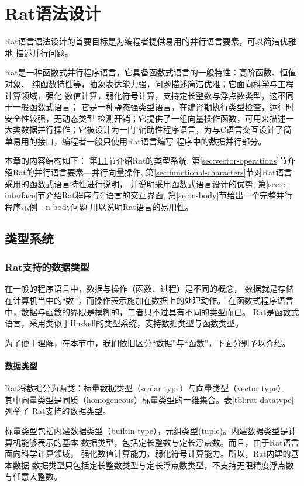 \chapter{Rat语法设计}\label{chap:frontend}
Rat语言语法设计的首要目标是为编程者提供易用的并行语言要素，可以简洁优雅地
描述并行问题。

Rat是一种函数式并行程序语言，它具备函数式语言的一般特性：高阶函数、恒值对象、
纯函数特性等，抽象表达能力强，问题描述简洁优雅；它面向科学与工程计算领域，强化
数值计算，弱化符号计算，支持定长整数与浮点数类型，这不同于一般函数式语言；
它是一种静态强类型语言，在编译期执行类型检查，运行时安全性较强，无动态类型
检测开销；它提供了一组向量操作函数，可用来描述一大类数据并行操作；它被设计为一门
辅助性程序语言，为与C语言交互设计了简单易用的接口，编程者一般只使用Rat语言编写
程序中的数据并行部分。

本章的内容结构如下：
第\ref{sec:type-system}节介绍Rat的类型系统,
第\ref{sec:vector-operations}节介绍Rat的并行语言要素---并行向量操作,
第\ref{sec:functional-characters}节对Rat语言采用的函数式语言特性进行说明，
并说明采用函数式语言设计的优势,
第\ref{sec:c-interface}节介绍Rat程序与C语言的交互界面,
第\ref{sec:n-body}节给出一个完整并行程序示例---n-body问题
用以说明Rat语言的易用性。

\section{类型系统}\label{sec:type-system}
\subsection{Rat支持的数据类型}
在一般的程序语言中，数据与操作（函数、过程）是不同的概念，
数据就是存储在计算机当中的“数”，而操作表示施加在数据上的处理动作。
在函数式程序语言中，数据与函数的界限是模糊的，二者只不过具有不同的类型而已。
Rat是函数式语言，采用类似于Haskell的类型系统，支持数据类型与函数类型。

为了便于理解，在本节中，我们依旧区分“数据”与“函数”，下面分别予以介绍。

\subsubsection{数据类型}
Rat将数据分为两类：标量数据类型（scalar type）与向量类型（vector type）。
其中向量类型是同质（homogeneous）标量类型的一维集合。表\ref{tbl:rat-datatype}列举了
Rat支持的数据类型。

标量类型包括内建数据类型（builtin type），元组类型(tuple)。内建数据类型是计算机能够表示的基本
数据类型，包括定长整数与定长浮点数。而且，由于Rat语言面向科学计算领域，
强化数值计算能力，弱化符号计算能力。所以，Rat内建的基本数据
数据类型只包括定长整数类型与定长浮点数类型，不支持无限精度浮点数与任意大整数。

